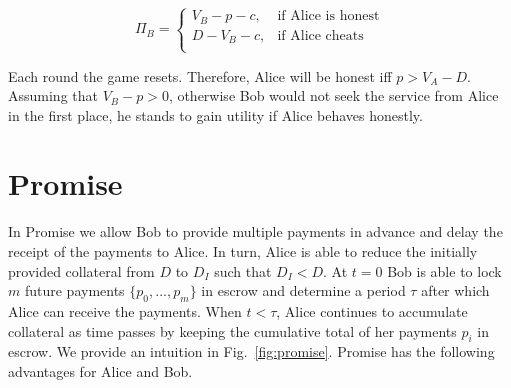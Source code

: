 \documentclass[runningheads]{llncs}
\newcommand{\sys}{Promise\xspace}
\begin{document}



\begin{equation}
\label{eq:status-quo_bob}
\Pi_B= 
\begin{cases}
V_B - p-c, & \text{if Alice is honest} \\
D -V_B -c , & \text{if Alice cheats} \\
\end{cases}
\end{equation}


Each round the game resets. 
Therefore, Alice will be honest iff $p > V_A -D$. %
Assuming that $V_B-p>0$, otherwise Bob would not seek the service from Alice in the first place, he stands to gain utility if Alice behaves honestly. %




\section{\sys}
\label{sec:promise}

In \sys we allow Bob to provide multiple payments in advance and delay the receipt of the payments to Alice.
In turn, Alice is able to reduce the initially provided collateral from $D$ to $D_I$ such that $D_I < D$.
At $t=0$ Bob is able to lock $m$ future payments $\{p_0, ..., p_m\}$ in escrow and determine a period $\tau$ after which Alice can receive the payments.
When $t < \tau$, Alice continues to accumulate collateral as time passes by keeping the cumulative total of her payments $p_i$ in escrow. 
We provide an intuition in Fig.~\ref{fig:promise}.
\sys has the following advantages for Alice and Bob. 
\end{document}
